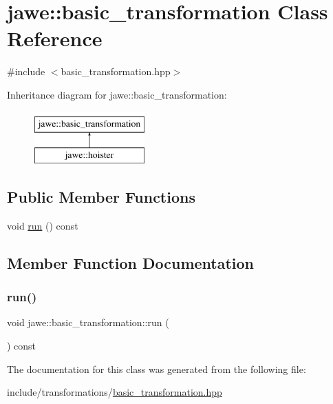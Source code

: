 \hypertarget{classjawe_1_1basic__transformation}{}\section{jawe\+:\+:basic\+\_\+transformation Class Reference}
\label{classjawe_1_1basic__transformation}


{\ttfamily \#include $<$basic\+\_\+transformation.\+hpp$>$}

Inheritance diagram for jawe\+:\+:basic\+\_\+transformation\+:\begin{figure}[H]
\begin{center}
\leavevmode
\includegraphics[height=2.000000cm]{classjawe_1_1basic__transformation}
\end{center}
\end{figure}
\subsection*{Public Member Functions}
\begin{DoxyCompactItemize}
\item 
void \hyperlink{classjawe_1_1basic__transformation_a40c48c034ae20b1f2624bc33158e33e0}{run} () const
\end{DoxyCompactItemize}


\subsection{Member Function Documentation}
\mbox{\label{classjawe_1_1basic__transformation_a40c48c034ae20b1f2624bc33158e33e0}} 
\subsubsection{\texorpdfstring{run()}{run()}}
{\footnotesize\ttfamily void jawe\+::basic\+\_\+transformation\+::run (\begin{DoxyParamCaption}{ }\end{DoxyParamCaption}) const}



The documentation for this class was generated from the following file\+:\begin{DoxyCompactItemize}
\item 
include/transformations/\hyperlink{basic__transformation_8hpp}{basic\+\_\+transformation.\+hpp}\end{DoxyCompactItemize}
